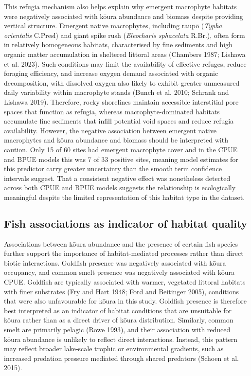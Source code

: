 \documentclass[
  12pt,
  a4paper,
  oneside]{scrbook}
\newcounter{none} %
\begin{document}
This refugia mechanism also helps explain why emergent macrophyte
habitats were negatively associated with kōura abundance and biomass
despite providing vertical structure. Emergent native macrophytes,
including raupō (\emph{Typha orientalis} C.Presl) and giant spike rush
(\emph{Eleocharis sphacelata} R.Br.), often form in relatively
homogeneous habitats, characterised by fine sediments and high organic
matter accumulation in sheltered littoral areas (Chambers 1987; Lishawa
et al. 2023). Such conditions may limit the availability of effective
refuges, reduce foraging efficiency, and increase oxygen demand
associated with organic decomposition, with dissolved oxygen also likely
to exhibit greater unmeasured daily variability within macrophyte stands
(Bunch et al. 2010; Schrank and Lishawa 2019). Therefore, rocky
shorelines maintain accessible interstitial pore spaces that function as
refugia, whereas macrophyte-dominated habitats accumulate fine sediments
that infill potential void spaces and reduce refugia availability.
However, the negative association between emergent native macrophytes
and kōura abundance and biomass should be interpreted with caution. Only
15 of 60 sites had emergent macrophyte cover and in the CPUE and BPUE
models this was 7 of 33 positive sites, meaning model estimates for this
predictor carry greater uncertainty than the smooth term confidence
intervals suggest. That a consistent negative effect was nonetheless
detected across both CPUE and BPUE models suggests the relationship is
ecologically meaningful despite the limited representation of this
habitat type in the dataset.

\subsection{Fish associations as indicator of habitat
quality}\label{fish-associations-as-indicator-of-habitat-quality}

Associations between kōura abundance and the presence of certain fish
species further support the importance of habitat-mediated processes
rather than direct biotic interactions. Goldfish presence was negatively
associated with kōura occupancy, and common smelt presence was
negatively associated with kōura CPUE. Goldfish are typically associated
with warmer, vegetated littoral habitats with finer substrates (Fry and
Hart 1948; Ford and Beitinger 2005), conditions that were also
unfavourable for kōura in this study. Goldfish presence is therefore
best interpreted as an indicator of habitat conditions that are
unsuitable for kōura rather than as a direct driver of kōura
distribution. Similarly, common smelt are primarily pelagic (Rowe 1993),
and their association with reduced kōura abundance is unlikely to
reflect direct interactions. Instead, this pattern may reflect broader
lake-scale trophic or environmental gradients, such as increased
predation pressure mediated through shared predators (Schoen et al.
2015).
\end{document}
